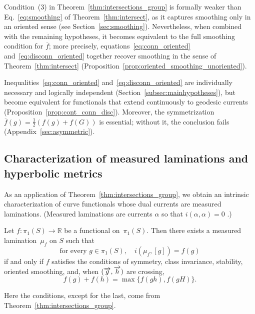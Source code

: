 Condition~(3) in Theorem~\ref{thm:intersections_group} is formally
weaker than Eq.~\eqref{eq:smoothing} of Theorem~\ref{thm:intersect}, as
it captures smoothing only in an oriented sense (see
Section~\ref{sec:smoothing}). Nevertheless, when combined with the
remaining hypotheses, it becomes equivalent to the full smoothing
condition for $\overline{f}$; more precisely, equations~\eqref{eq:conn_oriented}
and~\eqref{eq:disconn_oriented} together recover smoothing in the
sense of Theorem~\ref{thm:intersect}
(Proposition~\ref{prop:oriented_smoothing_unoriented}).

Inequalities~\eqref{eq:conn_oriented} and~\eqref{eq:disconn_oriented} are individually necessary and logically independent (Section~\ref{subsec:mainhypotheses}), but become equivalent for functionals that extend continuously to geodesic currents (Proposition~\ref{prop:cont_conn_disc}). Moreover,
the symmetrization $\overline f(g)=\tfrac12(f(g)+f(G))$ is
essential; without it, the conclusion fails
(Appendix~\ref{sec:asymmetric}).

\subsection{Characterization of measured laminations and hyperbolic metrics}

As an application of Theorem~\ref{thm:intersections_group}, we obtain
an intrinsic
characterization of curve functionals whose dual currents are
measured laminations.
(Measured laminations are currents $\alpha$
so that $i(\alpha,\alpha)=0$
\cite[Proposition~17]{Bonahon88:GeodesicCurrent}.)

\begin{mainthm}
\label{thm:lam-char}
Let $f \colon \pi_1(S) \to \mathbb{R}$ be a functional on~$\pi_1(S)$.
Then there exists a measured lamination~$\mu_{f}$ on $S$ such that
\[
\text{for every } g\in \pi_1(S),\quad
i(\mu_{f},[g])=f(g)
\]
if and only if $f$ satisfies the conditions of symmetry, class invariance,
stability, oriented smoothing,
and, when $(\overrightarrow{g}, \overrightarrow{h})$ are crossing,
\begin{equation}\label{eq:max-smoothing}
f(g)+f(h)=\max\{f(gh),f(gH)\}.
\end{equation}
\end{mainthm}

Here the conditions, except for the last, come from
Theorem~\ref{thm:intersections_group}.

